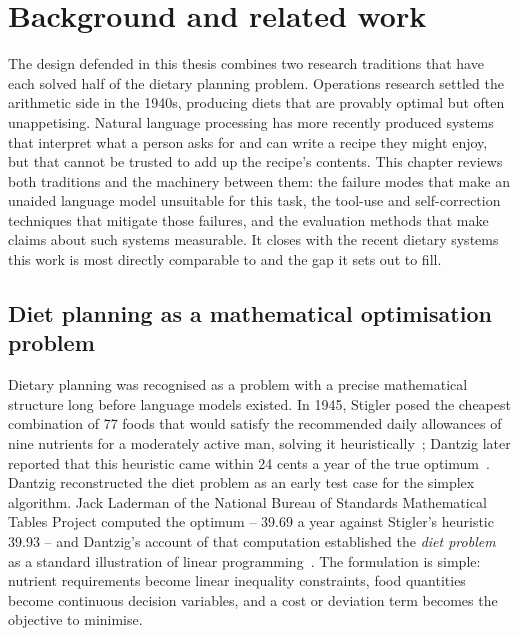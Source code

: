 \chapter{Background and related work}
\label{cha:background}

The design defended in this thesis combines two research traditions that have each solved half of the dietary planning problem. Operations research settled the arithmetic side in the 1940s, producing diets that are provably optimal but often unappetising. Natural language processing has more recently produced systems that interpret what a person asks for and can write a recipe they might enjoy, but that cannot be trusted to add up the recipe's contents. This chapter reviews both traditions and the machinery between them: the failure modes that make an unaided language model unsuitable for this task, the tool-use and self-correction techniques that mitigate those failures, and the evaluation methods that make claims about such systems measurable. It closes with the recent dietary systems this work is most directly comparable to and the gap it sets out to fill.

\section{Diet planning as a mathematical optimisation problem}
\label{sec:background-diet-optimisation}

Dietary planning was recognised as a problem with a precise mathematical structure long before language models existed. In 1945, Stigler posed the cheapest combination of \num{77} foods that would satisfy the recommended daily allowances of nine nutrients for a moderately active man, solving it heuristically~\cite{stigler1945cost}; Dantzig later reported that this heuristic came within \num{24} cents a year of the true optimum~\cite{dantzig1990diet}. Dantzig reconstructed the diet problem as an early test case for the simplex algorithm. Jack Laderman of the National Bureau of Standards Mathematical Tables Project computed the optimum -- \textdollar\num{39.69} a year against Stigler's heuristic \textdollar\num{39.93} -- and Dantzig's account of that computation established the \emph{diet problem} as a standard illustration of linear programming~\cite{dantzig1990diet}. The formulation is simple: nutrient requirements become linear inequality constraints, food quantities become continuous decision variables, and a cost or deviation term becomes the objective to minimise.

